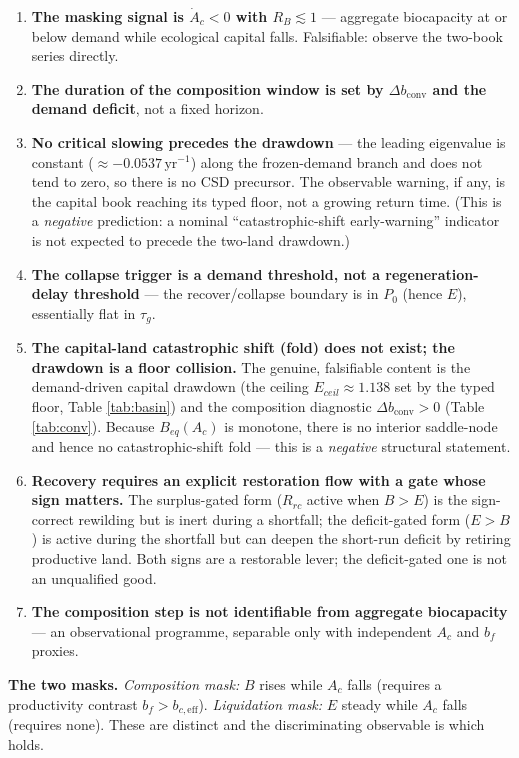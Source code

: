\documentclass[11pt]{article}
\begin{document}
\begin{enumerate}
\item \textbf{The masking signal is $\dot A_c<0$ with $R_B\lesssim1$} --- aggregate biocapacity at or below demand while ecological capital falls. Falsifiable: observe the two-book series directly.
\item \textbf{The duration of the composition window is set by $\Delta b_{\mathrm{conv}}$ and the demand deficit}, not a fixed horizon.
\item \textbf{No critical slowing precedes the drawdown} --- the leading eigenvalue is constant ($\approx-0.0537\,\text{yr}^{-1}$) along the frozen-demand branch and does not tend to zero, so there is no CSD precursor. The observable warning, if any, is the capital book reaching its typed floor, not a growing return time. (This is a \emph{negative} prediction: a nominal ``catastrophic-shift early-warning'' indicator is not expected to precede the two-land drawdown.)
\item \textbf{The collapse trigger is a demand threshold, not a regeneration-delay threshold} --- the recover/collapse boundary is in $P_0$ (hence $E$), essentially flat in $\tau_g$.
\item \textbf{The capital-land catastrophic shift (fold) does not exist; the drawdown is a floor collision.} The genuine, falsifiable content is the demand-driven capital drawdown (the ceiling $E_{ceil}\approx1.138$ set by the typed floor, Table \ref{tab:basin}) and the composition diagnostic $\Delta b_{\mathrm{conv}}>0$ (Table \ref{tab:conv}). Because $B_{eq}(A_c)$ is monotone, there is no interior saddle-node and hence no catastrophic-shift fold --- this is a \emph{negative} structural statement.
\item \textbf{Recovery requires an explicit restoration flow with a gate whose sign matters.} The surplus-gated form ($R_{rc}$ active when $B>E$) is the sign-correct rewilding but is inert during a shortfall; the deficit-gated form ($E>B$) is active during the shortfall but can deepen the short-run deficit by retiring productive land. Both signs are a restorable lever; the deficit-gated one is not an unqualified good.
\item \textbf{The composition step is not identifiable from aggregate biocapacity} --- an observational programme, separable only with independent $A_c$ and $b_f$ proxies.
\end{enumerate}

\noindent\textbf{The two masks.} \emph{Composition mask:} $B$ rises while $A_c$ falls (requires a productivity contrast $b_f>b_{c,\mathrm{eff}}$). \emph{Liquidation mask:} $E$ steady while $A_c$ falls (requires none). These are distinct and the discriminating observable is which holds.
\end{document}
